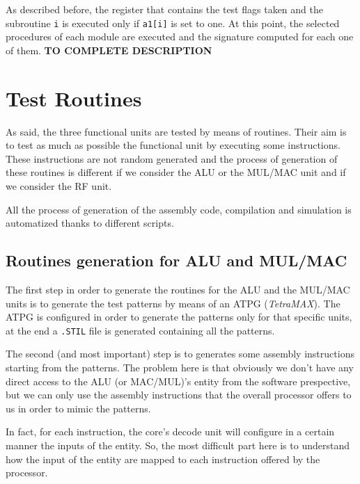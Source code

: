 \documentclass[paper=a4, fontsize=10pt]{scrartcl}	%
\begin{document}
	As described before, the register that contains the test flags taken and the subroutine \texttt{i} is executed only if \texttt{a1[i]} is set to one. At this point, the selected procedures of each module are executed and the signature computed for each one of them. \newline\newline\textbf{TO COMPLETE DESCRIPTION}

	\section{Test Routines}
	As said, the three functional units are tested by means of routines. Their aim is to test as much as possible the functional unit by executing some instructions. These instructions are not random generated and the process of generation of these routines is different if we consider the ALU or the MUL/MAC unit and if we consider the RF unit. \newline

	All the process of generation of the assembly code, compilation and simulation is automatized thanks to different scripts. 

	\subsection{Routines generation for ALU and MUL/MAC}
	The first step in order to generate the routines for the ALU and the MUL/MAC units is to generate the test patterns by means of an ATPG (\textit{TetraMAX}). The ATPG is configured in order to generate the patterns only for that specific units, at the end a \texttt{.STIL} file is generated containing all the patterns. \newline

	The second (and most important) step is to generates some assembly instructions starting from the patterns. The problem here is that obviously we don't have any direct access to the ALU (or MAC/MUL)'s entity from the software prespective, but we can only use the assembly instructions that the overall processor offers to us in order to mimic the patterns. \newline
	
	In fact, for each instruction, the core's decode unit will configure in a certain manner the inputs of the entity. So, the most difficult part here is to understand how the input of the entity are mapped to each instruction offered by the processor. \newline
\end{document}
